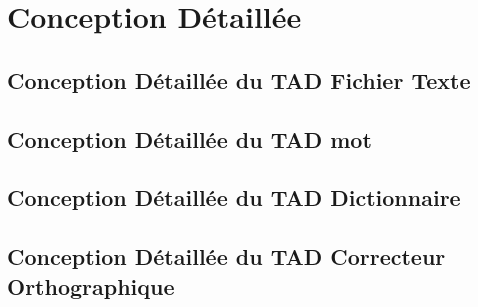 \section{Conception Détaillée}
	\subsection{Conception Détaillée du TAD Fichier Texte}
		
		
	\subsection{Conception Détaillée du TAD mot}
		
	\newpage	
	\subsection{Conception Détaillée du TAD Dictionnaire}
		
	\newpage
	\subsection{Conception Détaillée du TAD Correcteur Orthographique}
		
		
